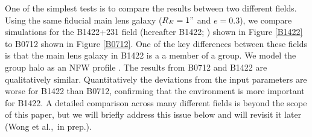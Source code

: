 One of the simplest tests is to compare the results between two different fields. Using the same fiducial main lens galaxy ($R_E = 1"$ and $e=0.3$), we compare simulations for the B1422+231 field (hereafter B1422; \citealt{Kundic97_b1422,Tonry98}) shown in Figure \ref{B1422} to B0712 shown in Figure \ref{B0712}. One of the key differences between these fields is that the main lens galaxy in B1422 is a a member of a group. We model the group halo as an NFW profile \citep[][note that the group halo is also subject to our cuts on $\Delta_3 x$]{Navarro97}. The results from B0712 and B1422 are qualitatively similar. Quantitatively the deviations from the input parameters are worse for B1422 than B0712, confirming that the environment is more important for B1422. A detailed comparison across many different fields is beyond the scope of this paper, but we will briefly address this issue below and will revisit it later (Wong et al.,~in prep.).